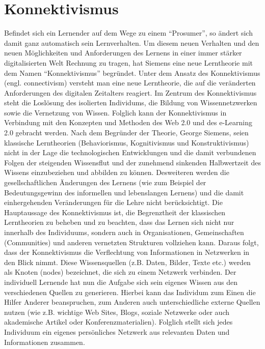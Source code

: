 \section{Konnektivismus}
Befindet sich ein Lernender auf dem Wege zu einem "`Prosumer"', so ändert sich damit ganz automatisch sein Lernverhalten. Um diesem neuen Verhalten und den neuen Möglichkeiten und Anforderungen des Lernens in einer immer stärker digitalisierten Welt Rechnung zu tragen, hat Siemens eine neue Lerntheorie mit dem Namen "`Konnektivismus"' begründet. Unter dem Ansatz des Konnektivismus (engl. connectivism) versteht man eine neue Lerntheorie, die auf die veränderten Anforderungen des digitalen Zeitalters reagiert. Im Zentrum des Konnektivismus steht die Loslösung des isolierten Individums, die Bildung von Wissennetzwerken sowie die Vernetzung von Wissen. Folglich kann der Konnektivismus in Verbindung mit den Konzepten und Methoden des Web 2.0 und des e-Learning 2.0 gebracht werden.
Nach dem Begründer der Theorie, George Siemens, seien klassische Lerntheorien (Behaviorismus, Kognitivismus und Konstruktivismus) nicht in der Lage die technologischen Entwicklungen und die damit verbundenen Folgen der steigenden Wissensflut und der zunehmend sinkenden Halbwertzeit des Wissens einzubeziehen und abbilden zu können. Desweiteren werden die gesellschaftlichen Änderungen des Lernens (wie zum Beispiel der Bedeutungsgewinn des informellen und lebenslangen Lernens) und die damit einhergehenden Veränderungen für die Lehre nicht berücksichtigt.
Die Hauptaussage des Konnektivismus ist, die Begrenztheit der klassischen Lerntheorien zu beheben und zu beachten, dass das Lernen sich nicht nur innerhalb des Individuums, sondern auch in Organisationen, Gemeinschaften (Communities) und anderen vernetzten Strukturen vollziehen kann. Daraus folgt, dass der Konnektivismus die Verflechtung von Informationen in Netzwerken in den Blick nimmt. Diese Wissensquellen (z.B. Daten, Bilder, Texte etc.) werden als Knoten (nodes) bezeichnet, die sich zu einem Netzwerk verbinden. Der individuell Lernende hat nun die Aufgabe sich sein eigenes Wissen aus den verschiedenen Quellen zu generieren. Hierbei kann das Individum zum Einen die Hilfer Anderer beanspruchen, zum Anderen auch unterschiedliche externe Quellen nutzen (wie z.B. wichtige Web Sites, Blogs, soziale Netzwerke oder auch akademische Artikel oder Konferenzmaterialien). Folglich stellt sich jedes Individuum ein eigenes persönliches Netzwerk aus relevanten Daten und Informationen zusammen. 

